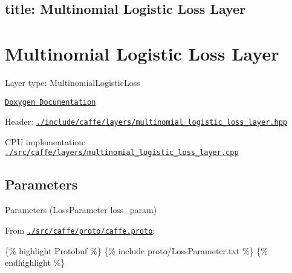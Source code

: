

 \subsection*{title\+: Multinomial Logistic Loss Layer }

\section*{Multinomial Logistic Loss Layer}


\begin{DoxyItemize}
\item Layer type\+: {\ttfamily Multinomial\+Logistic\+Loss}
\item \href{http://caffe.berkeleyvision.org/doxygen/classcaffe_1_1MultinomialLogisticLossLayer.html}{\tt Doxygen Documentation}
\item Header\+: \href{https://github.com/BVLC/caffe/blob/master/include/caffe/layers/multinomial_logistic_loss_layer.hpp}{\tt {\ttfamily ./include/caffe/layers/multinomial\+\_\+logistic\+\_\+loss\+\_\+layer.hpp}}
\item C\+PU implementation\+: \href{https://github.com/BVLC/caffe/blob/master/src/caffe/layers/multinomial_logistic_loss_layer.cpp}{\tt {\ttfamily ./src/caffe/layers/multinomial\+\_\+logistic\+\_\+loss\+\_\+layer.cpp}}
\end{DoxyItemize}

\subsection*{Parameters}


\begin{DoxyItemize}
\item Parameters ({\ttfamily Loss\+Parameter loss\+\_\+param})
\item From \href{https://github.com/BVLC/caffe/blob/master/src/caffe/proto/caffe.proto}{\tt {\ttfamily ./src/caffe/proto/caffe.proto}}\+:
\end{DoxyItemize}

\{\% highlight Protobuf \%\} \{\% include proto/\+Loss\+Parameter.\+txt \%\} \{\% endhighlight \%\} 
